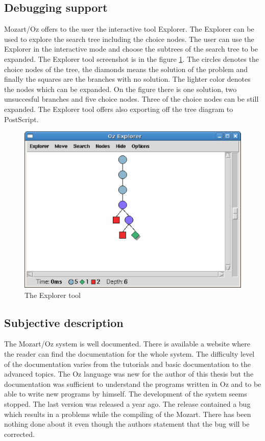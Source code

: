 \subsection{Debugging support}
Mozart/Oz offers to the user the interactive tool Explorer. The Explorer can be used to explore 
the search tree including the choice nodes. The user can use the Explorer in the 
interactive mode and choose the subtrees of the search tree to be expanded. 
 The Explorer tool screenshot is in the figure \ref{mozart:explorer}. The circles 
 denotes the choice nodes of the tree, the diamonds means the solution of
 the problem and finally the squares are the branches with no solution. The lighter color
 denotes the nodes which can be expanded. On the figure there is one solution, two 
 unsuccesful branches and five choice nodes. Three of the choice nodes can be still expanded.
 The Explorer tool offers also exporting off the tree diagram to PostScript.

\begin{figure}
\caption{\label{mozart:explorer}The Explorer tool}
\begin{center}
\includegraphics[scale=0.3]{images/screenshoty/explorer.eps}
\end{center}
\end{figure}


\subsection{Subjective description}
The Mozart/Oz system is well documented. There is available a website where the reader
can find the documentation for the whole system. The difficulty level of the documentation
varies from the tutorials and basic documentation to the advanced topics. The Oz language 
was new for the author of this thesis but the documentation was sufficient 
to understand the programs written in Oz and to be able to write new programs by
himself. The development of the system seems stopped. The last version was released
a year ago. The release contained a bug which results in a problems while the compiling
of the Mozart. There has been nothing done about it even though the authors statement
that the bug will be corrected.